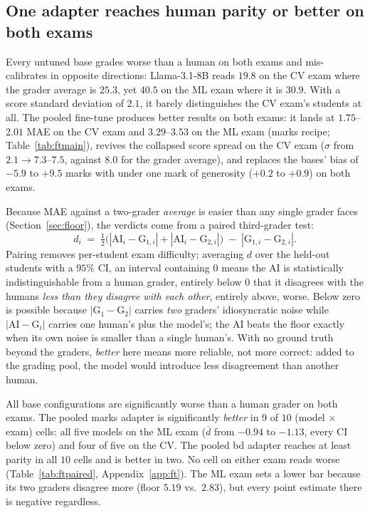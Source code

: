 \subsection{One adapter reaches human parity or better on both exams}
\label{sec:finetune:parity}

  Every untuned base grades worse than a human on both exams and
  mis-calibrates in opposite directions: Llama-3.1-$8$B reads $19.8$ on the
  CV exam where the grader average is $25.3$, yet $40.5$ on the
  ML exam where it is $30.9$. With a score standard deviation
  of $2.1$, it barely distinguishes the CV exam's students at
  all. The pooled fine-tune produces better results on both exams: it lands
  at $1.75$--$2.01$ MAE on the CV exam and $3.29$--$3.53$ on the
  ML exam (marks recipe; Table~\ref{tab:ftmain}), revives the collapsed
  score spread on the CV exam ($\sigma$ from $2.1 \to 7.3$--$7.5$,
  against $8.0$ for the grader average), and replaces the bases' bias of
  $-5.9$ to $+9.5$ marks with under one mark of generosity ($+0.2$ to $+0.9$)
  on both exams.

Because MAE against a two-grader \emph{average} is easier than any single grader faces (Section~\ref{sec:floor}), the verdicts come from a paired third-grader test:
\begin{equation}
d_i \;=\; \tfrac{1}{2}\big(|\mathrm{AI}_i-\mathrm{G}_{1,i}| + |\mathrm{AI}_i-\mathrm{G}_{2,i}|\big) \;-\; |\mathrm{G}_{1,i}-\mathrm{G}_{2,i}|.
\label{eq:paired}
\end{equation}
Pairing removes per-student exam difficulty; averaging $d$ over the held-out students with a $95\%$ CI, an interval containing $0$ means the AI is statistically indistinguishable from a human grader, entirely below $0$ that it disagrees with the humans \emph{less than they disagree with each other}, entirely above, worse. Below zero is possible because $|\mathrm{G}_1-\mathrm{G}_2|$ carries \emph{two} graders' idiosyncratic noise while $|\mathrm{AI}-\mathrm{G}_i|$ carries one human's plus the model's; the AI beats the floor exactly when its own noise is smaller than a single human's. With no ground truth beyond the graders, \emph{better}
  here means more reliable, not more correct: added to the grading pool, the
  model would introduce less disagreement than another human.

All base configurations are significantly worse than a human grader on both exams. The pooled marks adapter is significantly \emph{better} in $9$ of $10$ (model $\times$ exam) cells: all five models on the ML exam ($\overline{d}$
  from $-0.94$ to $-1.13$, every CI below zero) and four of five on the CV. The pooled bd adapter reaches at least parity in all $10$ cells and is better in two. No cell on either exam reads worse (Table~\ref{tab:ftpaired},
  Appendix~\ref{app:ft}). The ML exam sets a lower bar because its two graders disagree more (floor $5.19$ vs.\ $2.83$), but every point estimate there is negative regardless.

